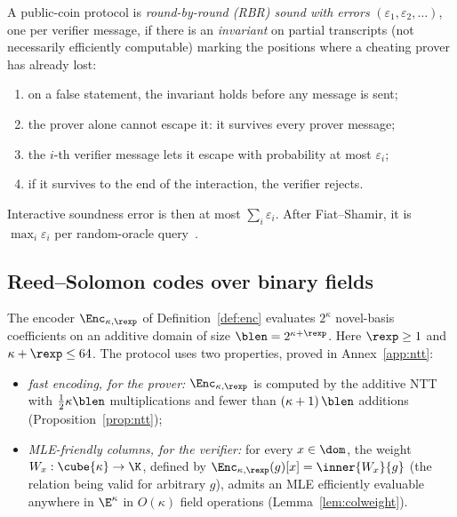 \begin{definition}\label{def:rbr}
A public-coin protocol is \emph{round-by-round (RBR) sound with errors} $(\varepsilon_1, \varepsilon_2, \dots)$, one per verifier message, if there is an \emph{invariant} on partial transcripts (not necessarily efficiently computable) marking the positions where a cheating prover has already lost:
\begin{enumerate}[itemsep=1pt,label=(\roman*)]
\item on a false statement, the invariant holds before any message is sent;
\item the prover alone cannot escape it: it survives every prover message;
\item the $i$-th verifier message lets it escape with probability at most $\varepsilon_i$;
\item if it survives to the end of the interaction, the verifier rejects.
\end{enumerate}
\end{definition}

Interactive soundness error is then at most $\sum_i \varepsilon_i$. After Fiat--Shamir, it is $\max_i \varepsilon_i$ per random-oracle query~\cite{CCHLRR19,BCS16}.

\subsection{Reed--Solomon codes over binary fields}\label{sec:binary-rs}

The encoder $\Enc_{\kappa,\rexp}$ of Definition~\ref{def:enc} evaluates $2^\kappa$ novel-basis coefficients on an additive domain of size $\blen=2^{\kappa+\rexp}$. Here $\rexp\ge1$ and $\kappa+\rexp\le64$. The protocol uses two properties, proved in Annex~\ref{app:ntt}:
\begin{itemize}[itemsep=2pt]
\item \emph{fast encoding, for the prover:} $\Enc_{\kappa,\rexp}$ is computed by the additive NTT with $\tfrac12 \kappa \blen$ multiplications and fewer than $(\kappa + 1)\, \blen$ additions (Proposition~\ref{prop:ntt});
\item \emph{MLE-friendly columns, for the verifier:} for every $x \in \dom$, the weight $W_x : \cube{\kappa} \to \K$, defined by $\Enc_{\kappa,\rexp}(g)[x] = \inner{W_x}{g}$ (the relation being valid for arbitrary $g$), admits an MLE efficiently evaluable anywhere in $\E^{\kappa}$ in $O(\kappa)$ field operations (Lemma~\ref{lem:colweight}).
\end{itemize}

